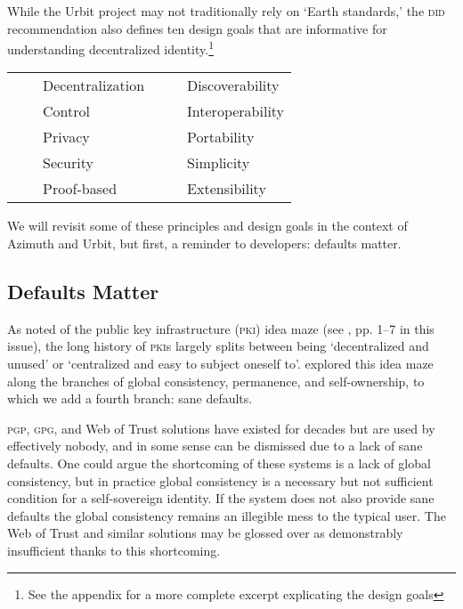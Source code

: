 \documentclass[twoside]{article}
\newcommand{\tabitem}{~~\llap{\textbullet}~~}
\begin{document}
While the Urbit project may not traditionally rely on `Earth standards,' the \textsc{did} recommendation also defines ten design goals that are informative for understanding decentralized identity.\footnote{See the appendix for a more complete excerpt explicating the design goals}

\begin{tabular}{ll}
  \tabitem  Decentralization
  &
  \tabitem  Discoverability \\
  \tabitem  Control
  &
  \tabitem  Interoperability \\
  \tabitem  Privacy
  &
  \tabitem  Portability \\
  \tabitem  Security
  &
  \tabitem  Simplicity \\
  \tabitem  Proof-based
  &
  \tabitem  Extensibility \\
\end{tabular}

We will revisit some of these principles and design goals in the context of Azimuth and Urbit, but first, a reminder to developers: defaults matter.

\subsection{Defaults Matter}

As  noted of the public key infrastructure (\textsc{pki}) idea maze (see \citet{Monk2024}, pp. 1–7 in this issue), the long history of \textsc{pki}s largely splits between being `decentralized and unused' or `centralized and easy to subject oneself to'.   explored this idea maze along the branches of global consistency, permanence, and self-ownership, to which we add a fourth branch: sane defaults.

\textsc{pgp}, \textsc{gpg}, and Web of Trust solutions have existed for decades but are used by effectively nobody, and in some sense can be dismissed due to a lack of sane defaults. One could argue the shortcoming of these systems is a lack of global consistency, but in practice global consistency is a necessary but not sufficient condition for a self-sovereign identity. If the system does not also provide sane defaults the global consistency remains an illegible mess to the typical user. The Web of Trust and similar solutions may be glossed over as demonstrably insufficient thanks to this shortcoming.
\end{document}
